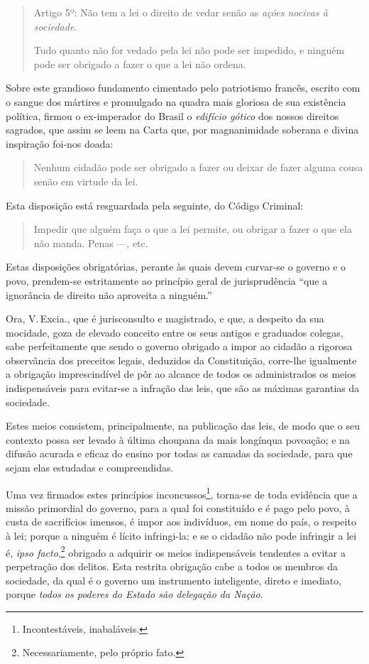 \begin{quote}
Artigo 5º: Não tem a lei o direito de vedar senão as \emph{ações
nocivas à sociedade}.

Tudo quanto não for vedado pela lei não pode ser impedido, e ninguém
pode ser obrigado a fazer o que a lei não ordena.
\end{quote}

Sobre este grandioso fundamento cimentado pelo patriotismo francês,
escrito com o sangue dos mártires e promulgado na quadra mais gloriosa
de sua existência política, firmou o ex-imperador do Brasil o
\emph{edifício gótico} dos nossos direitos sagrados, que assim se leem
na Carta que, por magnanimidade soberana e divina inspiração foi-nos
doada:

\begin{quote}
Nenhum cidadão pode ser obrigado a fazer ou deixar de fazer alguma
cousa senão em virtude da lei.
\end{quote}

Esta disposição está resguardada pela seguinte, do Código Criminal:

\begin{quote}
Impedir que alguém faça o que a lei permite, ou obrigar a fazer o que
ela não manda. Penas ---, etc.
\end{quote}

Estas disposições obrigatórias, perante às quais devem curvar-se o
governo e o povo, prendem-se estritamente ao princípio geral de
jurisprudência ``que a ignorância de direito não aproveita a ninguém.''

Ora, V.\,Excia., que é jurisconsulto e magistrado, e que, a despeito da
sua mocidade, goza de elevado conceito entre os seus antigos e graduados
colegas, sabe perfeitamente que sendo o governo obrigado a impor ao
cidadão a rigorosa observância dos preceitos legais, deduzidos da
Constituição, corre-lhe igualmente a obrigação imprescindível de pôr ao
alcance de todos os administrados os meios indispensáveis para evitar-se
a infração das leis, que são as máximas garantias da sociedade.

Estes meios consistem, principalmente, na publicação das leis, de modo
que o seu contexto possa ser levado à última choupana da mais longínqua
povoação; e na difusão acurada e eficaz do ensino por todas as camadas
da sociedade, para que sejam elas estudadas e compreendidas.

Uma vez firmados estes princípios inconcussos\footnote{Incontestáveis,
  inabaláveis.}, torna-se de toda evidência que a missão primordial do
governo, para a qual foi constituído e é pago pelo povo, à custa de
sacrifícios imensos, é impor aos indivíduos, em nome do país, o respeito
à lei; porque a ninguém é lícito infringi-la; e se o cidadão não pode
infringir a lei é, \emph{ipso facto},\footnote{Necessariamente, pelo
  próprio fato.} obrigado a adquirir os meios indispensáveis tendentes
a evitar a perpetração dos delitos. Esta restrita obrigação cabe a todos
os membros da sociedade, da qual é o governo um instrumento inteligente,
direto e imediato, porque \emph{todos os poderes do Estado são delegação
da Nação}.

